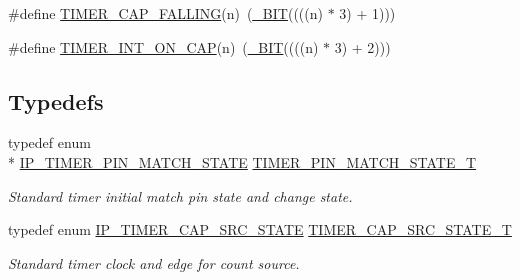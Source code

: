 \begin{DoxyCompactItemize}
\item 
\#define \hyperlink{group__TIMER__17XX__40XX_gad35ff35bf622cb530f2206ecdd861a7d}{T\-I\-M\-E\-R\-\_\-\-C\-A\-P\-\_\-\-F\-A\-L\-L\-I\-N\-G}(n)~(\hyperlink{group__LPC__Types__Public__Macros_ga7ee022f5e5a971a8324e4b7572d49170}{\-\_\-\-B\-I\-T}((((n) $\ast$ 3) + 1)))
\item 
\#define \hyperlink{group__TIMER__17XX__40XX_ga39a441a62cb174fd89ebc217417482c9}{T\-I\-M\-E\-R\-\_\-\-I\-N\-T\-\_\-\-O\-N\-\_\-\-C\-A\-P}(n)~(\hyperlink{group__LPC__Types__Public__Macros_ga7ee022f5e5a971a8324e4b7572d49170}{\-\_\-\-B\-I\-T}((((n) $\ast$ 3) + 2)))
\end{DoxyCompactItemize}
\subsection*{Typedefs}
\begin{DoxyCompactItemize}
\item 
typedef enum \\*
\hyperlink{group__TIMER__17XX__40XX_ga29caa12f43ff996d3ebbf7d5f9036f2c}{I\-P\-\_\-\-T\-I\-M\-E\-R\-\_\-\-P\-I\-N\-\_\-\-M\-A\-T\-C\-H\-\_\-\-S\-T\-A\-T\-E} \hyperlink{group__TIMER__17XX__40XX_ga15be0f559655d587ad466689f639ab72}{T\-I\-M\-E\-R\-\_\-\-P\-I\-N\-\_\-\-M\-A\-T\-C\-H\-\_\-\-S\-T\-A\-T\-E\-\_\-\-T}
\begin{DoxyCompactList}\small\item\em Standard timer initial match pin state and change state. \end{DoxyCompactList}\item 
typedef enum \hyperlink{group__TIMER__17XX__40XX_ga1ceafbd6fb46418e292878934efb63aa}{I\-P\-\_\-\-T\-I\-M\-E\-R\-\_\-\-C\-A\-P\-\_\-\-S\-R\-C\-\_\-\-S\-T\-A\-T\-E} \hyperlink{group__TIMER__17XX__40XX_ga3f9e5a3ea9ebb982339b786ff7946408}{T\-I\-M\-E\-R\-\_\-\-C\-A\-P\-\_\-\-S\-R\-C\-\_\-\-S\-T\-A\-T\-E\-\_\-\-T}
\begin{DoxyCompactList}\small\item\em Standard timer clock and edge for count source. \end{DoxyCompactList}\end{DoxyCompactItemize}
